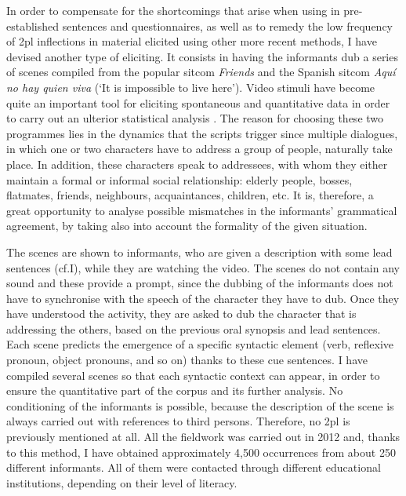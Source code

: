\documentclass[output=paper]{LSP/langsci}
\begin{document}
In order to compensate for the shortcomings that arise when using in pre-established sentences and questionnaires, as well as to remedy the low frequency of 2pl inflections in material elicited using other more recent methods, I have devised another type of eliciting. It consists in having the informants dub a series of scenes compiled from the popular sitcom \textit{Friends} and the Spanish sitcom \textit{Aquí no hay quien viva} (‘It is impossible to live here’). Video stimuli have become quite an important tool for eliciting spontaneous and quantitative data in order to carry out an ulterior statistical analysis \citep{chelliah_handbook_2011,mallinson_data_2013,thieberger_oxford_2011,lara_tratamientos_2015}. The reason for choosing these two programmes lies in the dynamics that the scripts trigger since multiple dialogues, in which one or two characters have to address a group of people, naturally take place. In addition, these characters speak to addressees, with whom they either maintain a formal or informal social relationship: elderly people, bosses, flatmates, friends, neighbours, acquaintances, children, etc. It is, therefore, a great opportunity to analyse possible mismatches in the informants’ grammatical agreement, by taking also into account the formality of the given situation. 

The scenes are shown to informants, who are given a description with some lead sentences (cf.I), while they are watching the video. The scenes do not contain any sound and these provide a prompt, since the dubbing of the informants does not have to synchronise with the speech of the character they have to dub. Once they have understood the activity, they are asked to dub the character that is addressing the others, based on the previous oral synopsis and lead sentences. Each scene predicts the emergence of a specific syntactic element (verb, reflexive pronoun, object pronouns, and so on) thanks to these cue sentences. I have compiled several scenes so that each syntactic context can appear, in order to ensure the quantitative part of the corpus and its further analysis. No conditioning of the informants is possible, because the description of the scene is always carried out with references to third persons. Therefore, no 2pl is previously mentioned at all. All the fieldwork was carried out in 2012 and, thanks to this method, I have obtained approximately 4,500 occurrences from about 250 different informants. All of them were contacted through different educational institutions, depending on their level of literacy.
\end{document}
